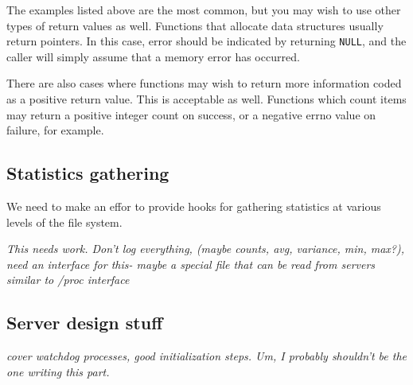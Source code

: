\documentclass[11pt, letterpaper]{article}
\begin{document}
The examples listed above are the most common, but you may wish to use
other types of return values as well.  Functions that allocate data
structures usually return pointers.  In this case, error should be
indicated by returning {\tt NULL}, and the caller will simply assume
that a memory error has occurred.  

There are also cases where functions may wish to return more information
coded as a positive return value.  This is acceptable as well.
Functions which count items may return a positive integer count on
success, or a negative errno value on failure, for example.

\subsection{Statistics gathering}

We need to make an effor to provide hooks for gathering statistics at
various levels of the file system.  

\emph{This needs work. Don't log everything, (maybe counts, avg, variance, min, max?),
need an interface for this- maybe a special file that can be read from
servers similar to /proc interface}

\subsection{Server design stuff}

\emph{cover watchdog processes, good initialization steps.  Um, I
probably shouldn't be the one writing this part.}
\end{document}
